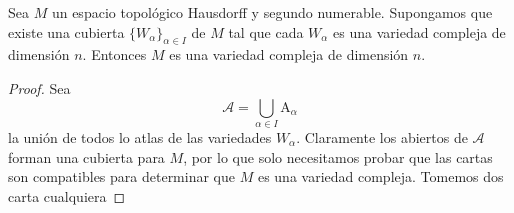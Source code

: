     \begin{lemma}\label{lemacubierta}
    	Sea $M$ un espacio topológico Hausdorff y segundo numerable. Supongamos que existe una cubierta $\{W_\alpha\}_{\alpha\in I}$ de $M$ tal que cada $W_\alpha$ es una variedad compleja de dimensión $n$. Entonces $M$ es una variedad compleja de dimensión $n$.
    \end{lemma}
    \begin{proof}
    	Sea 
    	\begin{equation*}
    		\mathcal{A}=\bigcup_{\alpha\in I}\mathrm{A}_\alpha
    	\end{equation*}
    	la unión de todos lo atlas de las variedades $W_\alpha$.
 		Claramente los abiertos de $\mathcal{A}$ forman una cubierta para $M$, por lo que solo necesitamos probar que las cartas son compatibles para determinar que $M$ es una variedad compleja. Tomemos dos carta cualquiera

\end{proof}
